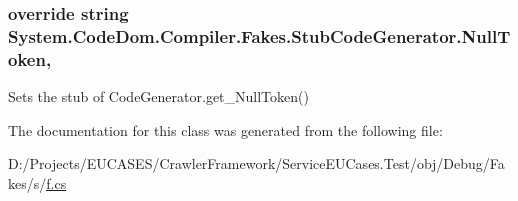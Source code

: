 \hypertarget{class_system_1_1_code_dom_1_1_compiler_1_1_fakes_1_1_stub_code_generator_a90f58aa3bbfff07b8da51f899ef112e7}{
\subsubsection[{Null\-Token}]{\setlength{\rightskip}{0pt plus 5cm}override string System.\-Code\-Dom.\-Compiler.\-Fakes.\-Stub\-Code\-Generator.\-Null\-Token\hspace{0.3cm}{\ttfamily [get]}, {\ttfamily [protected]}}}\label{class_system_1_1_code_dom_1_1_compiler_1_1_fakes_1_1_stub_code_generator_a90f58aa3bbfff07b8da51f899ef112e7}


Sets the stub of Code\-Generator.\-get\-\_\-\-Null\-Token()



The documentation for this class was generated from the following file\-:\begin{DoxyCompactItemize}
\item 
D\-:/\-Projects/\-E\-U\-C\-A\-S\-E\-S/\-Crawler\-Framework/\-Service\-E\-U\-Cases.\-Test/obj/\-Debug/\-Fakes/s/\hyperlink{s_2f_8cs}{f.\-cs}\end{DoxyCompactItemize}
